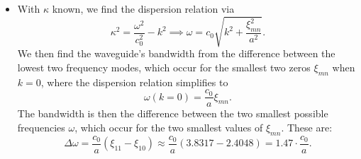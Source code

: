 \documentclass[11pt, a4paper]{article}
\begin{document}
\begin{itemize}
	\item With $ \kappa $ known, we find the dispersion relation via
	\begin{equation*}
		\kappa^{2} = \frac{\omega^{2}}{c_{0}^{2}} - k^{2} \implies \omega = c_{0}\sqrt{k^{2} + \frac{\xi_{mn}^{2}}{a^{2}}}.
	\end{equation*}
    We then find the waveguide's bandwidth from the difference between the lowest two frequency modes, which occur for the smallest two zeros $ \xi_{mn} $ when $ k = 0 $, where the dispersion relation simplifies to
	\begin{equation*}
		\omega(k = 0) = \frac{c_{0}}{a} \xi_{mn}.
	\end{equation*}
	The bandwidth is then the difference between the two smallest possible frequencies $ \omega $, which occur for the two smallest values of $ \xi_{mn} $. These are:
	\begin{equation*}
        \Delta \omega = \frac{c_{0}}{a} (\xi_{11} - \xi_{10}) \approx \frac{c_{0}}{a}(3.8317 - 2.4048) = 1.47 \cdot \frac{c_{0}}{a}.
	\end{equation*}
	
\end{itemize}
\end{document}
